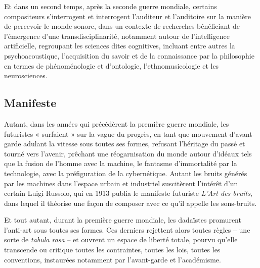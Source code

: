 Et dans un second temps, après la seconde guerre mondiale, certains compositeurs s'interrogent et interrogent l'auditeur et l'auditoire sur la manière de percevoir le monde sonore, dans un contexte de recherches bénéficiant de l'émergence d'une transdisciplinarité, notamment autour de l'intelligence artificielle, regroupant les sciences dites cognitives, incluant entre autres la psychoacoustique, l'acquisition du savoir et de la connaissance par la philosophie en termes de phénoménologie et d'ontologie, l'ethnomusicologie et les neurosciences.

\subsection*{Manifeste}
\label{manifeste}

Autant, dans les années qui précédèrent la première guerre mondiale, les futuristes « surfaient » sur la vague du progrès, en tant que mouvement d'avant-garde adulant la vitesse sous toutes ses formes, refusant l'héritage du passé et tourné vers l'avenir, prêchant une réogarnisation du monde autour d'idéaux tels que la fusion de l’homme avec la machine, le fantasme d'immortalité par la technologie, avec la préfiguration de la cybernétique. Autant les bruits générés par les machines dans l'espace urbain et industriel suscitèrent l'intérêt d'un certain Luigi Russolo, qui en 1913 publia le manifeste futuriste \textit{L'Art des bruits}, %
dans lequel il théorise une façon de composer avec ce qu'il appelle les sons-bruits. 

Et tout autant, durant la première guerre mondiale, les dadaïstes promurent l'anti-art sous toutes ses formes. Ces derniers rejettent alors toutes règles -- une sorte de \textit{tabula rasa} -- et ouvrent un espace de liberté totale, pourvu qu'elle transcende ou critique toutes les contraintes, toutes les lois, toutes les conventions, instaurées notamment par l'avant-garde et l'académisme. 

